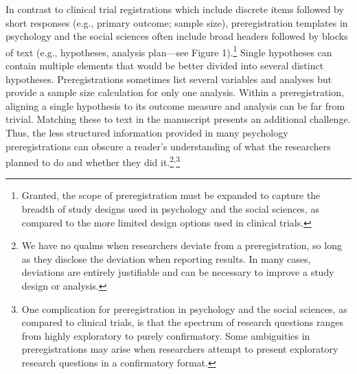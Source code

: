 \documentclass[authordate, meta]{jote-new-article}
\begin{document}
In contrast to clinical trial registrations which include discrete items followed by short responses (e.g., primary outcome; sample size), preregistration templates in psychology and the social sciences often include broad headers followed by blocks of text (e.g., hypotheses, analysis plan—see Figure 1).\footnote{ Granted, the scope of preregistration must be expanded to capture the breadth of study designs used in psychology and the social sciences, as compared to the more limited design options used in clinical trials.} Single hypotheses can contain multiple elements that would be better divided into several distinct hypotheses. Preregistrations sometimes list several variables and analyses but provide a sample size calculation for only one analysis. Within a preregistration, aligning a single hypothesis to its outcome measure and analysis can be far from trivial. Matching these to text in the manuscript presents an additional challenge. Thus, the less structured information provided in many psychology preregistrations can obscure a reader’s understanding of what the researchers planned to do and whether they did it.\footnote{ We have no qualms when researchers deviate from a preregistration, so long as they disclose the deviation when reporting results. In many cases, deviations are entirely justifiable and can be necessary to improve a study design or analysis.}\textsuperscript{,}\footnote{ One complication for preregistration in psychology and the social sciences, as compared to clinical trials, is that the spectrum of research questions ranges from highly exploratory to purely confirmatory. Some ambiguities in preregistrations may arise when researchers attempt to present exploratory research questions in a confirmatory format.}
\end{document}

